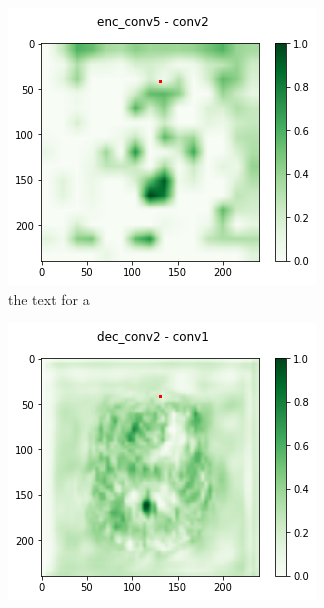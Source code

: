 \begin{figure}[H]
    \centering
    \begin{subfigure}{.33\textwidth}
        \centering
        \includegraphics[width=\linewidth]{chapters/04_segmentation/images/grad_cam_17.png}
        \caption{ the text for a}
    \end{subfigure}%
    \begin{subfigure}{.33\textwidth}
        \centering
        \includegraphics[width=\linewidth]{chapters/04_segmentation/images/grad_cam_24.png}

\end{subfigure}
\end{figure}
